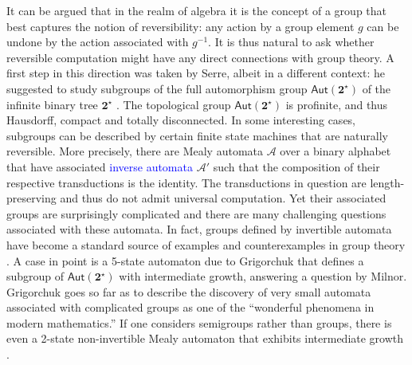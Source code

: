 \documentclass[12pt]{svmult}
\def\emph#1{\textcolor{blue}{#1}}
\def\2{\mathbf{2}}
\def\Aut{\mathsf{Aut}}
\def\SS{\Star{\2}}
\def\cA{\mathcal{A}}
\providecommand{\Star}[1]{{#1}^{\star}}
\begin{document}
It can be argued that in the realm of algebra it is the concept of a 
group that best captures the notion of reversibility:
any action by a group element $g$ can be undone by the action associated with $g^{-1}$. 
It is thus natural to ask whether reversible computation might have any direct 
connections with group theory. 
A first step in this direction was taken by Serre, albeit in a different context: 
he suggested to study subgroups of the full automorphism group $\Aut(\SS)$ of 
the infinite binary tree $\SS$ \cite{Serre77:arbres_amalgames}.
The topological group $\Aut(\SS)$ is profinite, and thus Hausdorff, compact and totally disconnected. 
In some interesting cases,  subgroups can be described by certain finite state 
machines that are naturally reversible. 
More precisely, there are Mealy automata $\cA$ over a binary alphabet that have 
associated \emph{inverse automata} $\cA'$ such that the composition of their respective 
transductions is the identity. 
The transductions in question are length-preserving and thus do not admit 
universal computation.
Yet their associated groups are surprisingly complicated and there are many challenging questions 
associated with these automata. 
In fact, groups defined by invertible automata have become a standard source 
of examples and counterexamples in group theory 
\cite{Nekrashevych05:self_similar_groups,Sidki00:one_rooted_trees}. 
A case in point is a 5-state automaton due to Grigorchuk \cite{GrigorchukNS00:automata_groups} that 
defines a subgroup of  $\Aut(\SS)$ with intermediate growth, answering a question by Milnor. 
Grigorchuk goes so far as to describe the discovery of very small automata 
associated with complicated groups as one of the ``wonderful phenomena in modern mathematics.'' 
If one considers semigroups rather than groups, there is even a 2-state non-invertible Mealy 
automaton that exhibits intermediate growth \cite{Bartholdi05:smallest_mealy}.
\end{document}
